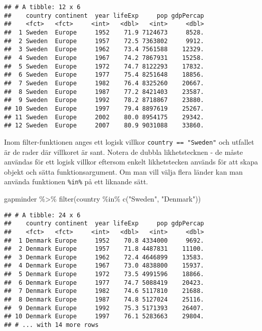 \documentclass[
]{book}
\newenvironment{Shaded}{\begin{snugshade}}{\end{snugshade}}
\newcommand{\FunctionTok}[1]{\textcolor[rgb]{0.00,0.00,0.00}{#1}}
\newcommand{\NormalTok}[1]{#1}
\newcommand{\SpecialCharTok}[1]{\textcolor[rgb]{0.00,0.00,0.00}{#1}}
\newcommand{\StringTok}[1]{\textcolor[rgb]{0.31,0.60,0.02}{#1}}
\theoremstyle{definition}
\theoremstyle{definition}
\theoremstyle{definition}
\theoremstyle{definition}
\theoremstyle{remark}
\begin{document}
\begin{verbatim}
## # A tibble: 12 x 6
##    country continent  year lifeExp     pop gdpPercap
##    <fct>   <fct>     <int>   <dbl>   <int>     <dbl>
##  1 Sweden  Europe     1952    71.9 7124673     8528.
##  2 Sweden  Europe     1957    72.5 7363802     9912.
##  3 Sweden  Europe     1962    73.4 7561588    12329.
##  4 Sweden  Europe     1967    74.2 7867931    15258.
##  5 Sweden  Europe     1972    74.7 8122293    17832.
##  6 Sweden  Europe     1977    75.4 8251648    18856.
##  7 Sweden  Europe     1982    76.4 8325260    20667.
##  8 Sweden  Europe     1987    77.2 8421403    23587.
##  9 Sweden  Europe     1992    78.2 8718867    23880.
## 10 Sweden  Europe     1997    79.4 8897619    25267.
## 11 Sweden  Europe     2002    80.0 8954175    29342.
## 12 Sweden  Europe     2007    80.9 9031088    33860.
\end{verbatim}

Inom filter-funktionen anges ett logisk villkor \texttt{country\ ==\ "Sweden"} och utfallet är de rader där villkoret är sant. Notera de dubbla likhetstecknen - de måste användas för ett logisk villkor eftersom enkelt likhetstecken används för att skapa objekt och sätta funktionsargument. Om man vill välja flera länder kan man använda funktionen \texttt{\%in\%} på ett liknande sätt.

\begin{Shaded}
\begin{Highlighting}[]
\NormalTok{gapminder }\SpecialCharTok{\%\textgreater{}\%} 
  \FunctionTok{filter}\NormalTok{(country }\SpecialCharTok{\%in\%} \FunctionTok{c}\NormalTok{(}\StringTok{"Sweden"}\NormalTok{, }\StringTok{"Denmark"}\NormalTok{))}
\end{Highlighting}
\end{Shaded}

\begin{verbatim}
## # A tibble: 24 x 6
##    country continent  year lifeExp     pop gdpPercap
##    <fct>   <fct>     <int>   <dbl>   <int>     <dbl>
##  1 Denmark Europe     1952    70.8 4334000     9692.
##  2 Denmark Europe     1957    71.8 4487831    11100.
##  3 Denmark Europe     1962    72.4 4646899    13583.
##  4 Denmark Europe     1967    73.0 4838800    15937.
##  5 Denmark Europe     1972    73.5 4991596    18866.
##  6 Denmark Europe     1977    74.7 5088419    20423.
##  7 Denmark Europe     1982    74.6 5117810    21688.
##  8 Denmark Europe     1987    74.8 5127024    25116.
##  9 Denmark Europe     1992    75.3 5171393    26407.
## 10 Denmark Europe     1997    76.1 5283663    29804.
## # ... with 14 more rows
\end{verbatim}
\end{document}
